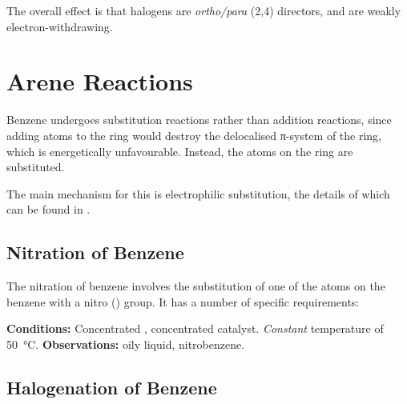 				The overall effect is that halogens are \textit{ortho/para} (2,4) directors, and are weakly electron-withdrawing.





	\pagebreak
	\hypertarget{AreneReactions}{}
	\section{Arene Reactions}

		Benzene undergoes substitution reactions rather than addition reactions, since adding atoms to the ring would destroy the
		delocalised π-system of the ring, which is energetically unfavourable. Instead, the  atoms on the ring are substituted.

		The main mechanism for this is electrophilic substitution, the details of which can be found in
		\hyperlink{AppendixElectrophilicSubstitution}{}.


		\subsection{Nitration of Benzene}

			The nitration of benzene involves the substitution of one of the  atoms on the benzene with a nitro () group.
			It has a number of specific requirements:

			\vspace{1.5em}
			\vbox{\textbf{Conditions:}	\tabto{35mm}Concentrated , concentrated  catalyst.
										\tabto{35mm}\textit{Constant} temperature of \SI{50}{\celsius}.}
			\vspace{0.75em}
			\vbox{\textbf{Observations:}\tabto{35mm} oily liquid, nitrobenzene.}



		\pagebreak
		\subsection{Halogenation of Benzene}


